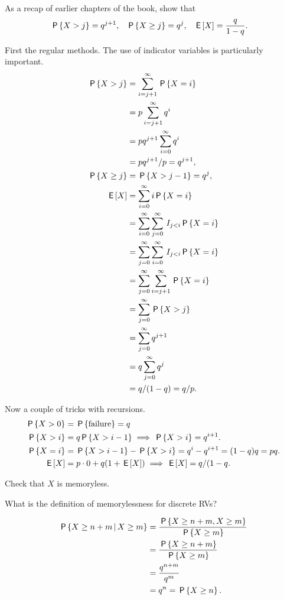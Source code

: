 \documentclass[a4paper,12pt]{article}
\begin{document}
\begin{exercise}
As a recap of earlier chapters of the book, show that
\begin{align}
  \label{eq:9}
\,\mathsf{P}\left\{X>j\right\} &= q^{j+1}, &\,\mathsf{P}\left\{X\geq j\right\} &=q^j,& \,\mathsf{E}\left[X\right]&=\frac q{1-q}.
 \end{align}
\begin{solution}
First the regular methods. The use of indicator variables is particularly important.
  \begin{align}
    \label{eq:5}
\,\mathsf{P}\left\{X>j\right\}    
&= \sum_{i=j+1}^{\infty} \,\mathsf{P}\left\{X=i\right\} \\
&= p\sum_{i=j+1}^{\infty} q^{i} \\
&= pq^{j+1}\sum_{i=0}^{\infty} q^{i} \\
&= pq^{j+1}/p = q^{j+1},\\
  \,\mathsf{P}\left\{X\geq j\right\}  &= \,\mathsf{P}\left\{X>j-1\right\} = q^{j}, \\
\,\mathsf{E}\left[X\right] 
&= \sum_{i=0}^{\infty} i\,\mathsf{P}\left\{X=i\right\} \\
&=  \sum_{i=0}^{\infty} \sum_{j=0}^{\infty} \,I_{j<i} \,\mathsf{P}\left\{X=i\right\} \\
&=  \sum_{j=0}^{\infty} \sum_{i=0}^{\infty} \,I_{j<i} \,\mathsf{P}\left\{X=i\right\} \\
&=  \sum_{j=0}^{\infty} \sum_{i=j+1}^{\infty}  \,\mathsf{P}\left\{X=i\right\} \\
&=  \sum_{j=0}^{\infty}  \,\mathsf{P}\left\{X>j\right\} \\
&=  \sum_{j=0}^{\infty}  q^{j+1}\\
&=  q \sum_{j=0}^{\infty}  q^{j}\\
&=  q/(1-q) = q/p.
  \end{align}


Now a couple of tricks with recursions.
\begin{align}
  \label{eq:8}
\,\mathsf{P}\left\{X>0\right\} &= \,\mathsf{P}\left\{\textrm{failure}\right\} = q\\
\,\mathsf{P}\left\{X>i\right\} &= q \,\mathsf{P}\left\{X>i-1\right\} \implies \,\mathsf{P}\left\{X>i\right\}=q^{i+1}.\\
\,\mathsf{P}\left\{X=i\right\} &= \,\mathsf{P}\left\{X>i-1\right\} - \,\mathsf{P}\left\{X>i\right\} = q^{i}-q^{i+1} = (1-q)q = p q.\\
\,\mathsf{E}\left[X\right] &= p\cdot 0 + q(1+\,\mathsf{E}\left[X\right]) \implies \,\mathsf{E}\left[X\right] = q/(1-q.
\end{align}

\end{solution}
\end{exercise}

\begin{exercise}
Check that $X$ is memoryless.
\begin{hint}
What is the definition of memorylessness for discrete RVs?  
\end{hint}
\begin{solution}
  \begin{align}
    \label{eq:13}
\,\mathsf{P}\left\{X\geq n+m\,\middle|\, X\geq m\right\} 
&= \frac{ \,\mathsf{P}\left\{X\geq n+m,  X\geq m\right\}}{\,\mathsf{P}\left\{X\geq m\right\}} \\
&= \frac{ \,\mathsf{P}\left\{X\geq n+m\right\}}{\,\mathsf{P}\left\{X\geq m\right\}} \\
&= \frac{ q^{n+m}}{q^m} \\
&= q^n= \,\mathsf{P}\left\{X\geq n\right\}.
  \end{align}
\end{solution}
\end{exercise}
\end{document}
